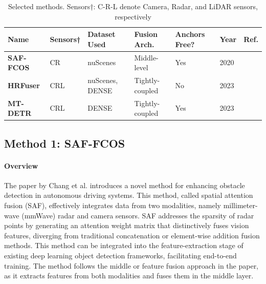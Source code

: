 \documentclass[report.tex]{subfiles}
\begin{document}
        \begin{table}[h]
            \centering
            \caption{Selected methods. Sensors†: C-R-L denote Camera, Radar, and LiDAR sensors, respectively}
            \begin{tabular}{|l|l|l|l|l|l|l|}
            \hline
            \textbf{Name} & \textbf{Sensors†} & \textbf{Dataset Used} & \textbf{Fusion Arch.} & \textbf{Anchors Free?} & \textbf{Year} & \textbf{Ref.}\\ \hline
            \textbf{SAF-FCOS} & CR & nuScenes & Middle-level & Yes & 2020 & \cite{chang2020spatial} \\ \hline
            \textbf{HRFuser} & CRL & nuScenes, DENSE & Tightly-coupled & No & 2023 & \cite{broedermann2022hrfuser} \\ \hline
            \textbf{MT-DETR} & CRL & DENSE & Tightly-coupled & Yes & 2023 & \cite{chu2023mt} \\ \hline
            \end{tabular}
            \label{tab:selected_methods}
        \end{table}

    

    \subsection{Method 1: SAF-FCOS}
    \label{sec:method_1}

    \paragraph*{Overview}
    
    The paper by Chang et al. \cite{chang2020spatial} introduces a novel method for enhancing obstacle detection in autonomous driving systems. This method, called spatial attention fusion (SAF), effectively integrates data from two modalities, namely millimeter-wave (mmWave) radar and camera sensors. SAF addresses the sparsity of radar points by generating an attention weight matrix that distinctively fuses vision features, diverging from traditional concatenation or element-wise addition fusion methods. This method can be integrated into the feature-extraction stage of existing deep learning object detection frameworks, facilitating end-to-end training. The method follows the middle or feature fusion approach in the paper, as it extracts features from both modalities and fuses them in the middle layer. 
\end{document}
